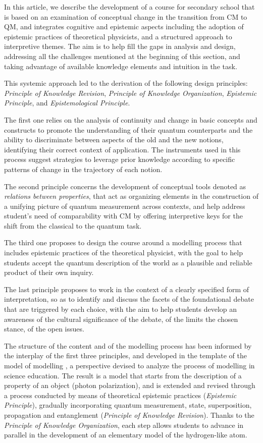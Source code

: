 \documentclass[twocolumn,secnumarabic,amssymb, nobibnotes, aps, prd, nofootinbib]{revtex4-2}
\begin{document}
In this article, we describe the development of a course for secondary school that is based on an examination of conceptual change in the transition from CM to QM, and integrates cognitive and epistemic aspects including the adoption of epistemic practices of theoretical physicists, and a structured approach to interpretive themes. The aim is to help fill the gaps in analysis and design, addressing all the challenges mentioned at the beginning of this section, and taking advantage of available knowledge elements and intuition in the task.

This systemic approach led to the derivation of the following design principles: \emph{Principle of Knowledge Revision}, \emph{Principle of Knowledge Organization}, \emph{Epistemic Principle}, and \emph{Epistemological Principle}.

The first one relies on the analysis of continuity and change in basic concepts and constructs to promote the understanding of their quantum counterparts and the ability to discriminate between aspects of the old and the new notions, identifying their correct context of application. The instruments used in this process suggest strategies to leverage prior knowledge according to specific patterns of change in the trajectory of each notion.

The second principle concerns the development of conceptual tools denoted as \emph{relations between properties}, that act as organizing elements in the construction of a unifying picture of quantum measurement across contexts, and help address student's need of comparability with CM by offering interpretive keys for the shift from the classical to the quantum task.

The third one proposes to design the course around a modelling process that includes epistemic practices of the theoretical physicist, with the goal to help students accept the quantum description of the world as a plausible and reliable product of their own inquiry.

The last principle proposes to work in the context of a clearly specified form of interpretation, so as to identify and discuss the facets of the foundational debate that are triggered by each choice, with the aim to help students develop an awareness of the cultural significance of the debate, of the limits the chosen stance, of the open issues.

The structure of the content and of the modelling process has been informed by the interplay of the first three principles, and developed in the template of the model of modelling \cite{Gilbert2016}, a perspective devised to analyze the process of modelling in science education. The result is a model that starts from the description of a property of an object (photon polarization), and is extended and revised through a process conducted by means of theoretical epistemic practices (\emph{Epistemic Principle}), gradually incorporating quantum measurement, state, superposition, propagation and entanglement (\emph{Principle of Knowledge Revision}). Thanks to the \emph{Principle of Knowledge Organization}, each step allows students to advance in parallel in the development of an elementary model of the hydrogen-like atom.
\end{document}
